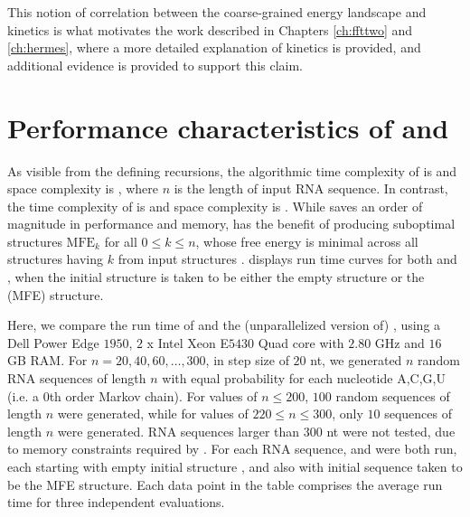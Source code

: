This notion of correlation between the coarse-grained energy landscape and
kinetics is what motivates the work described in Chapters \ref{ch:ffttwo}
and \ref{ch:hermes}, where a more detailed explanation of kinetics is provided,
and additional evidence is provided to support this claim.

\section{Performance characteristics of \fftbor and \rnabor}
\label{sec:fftbor:speed}

As visible from the defining recursions, the algorithmic time complexity of
\rnabor is  and space complexity is , where $n$ is
the length of input RNA sequence. In contrast, the time complexity of
\fftbor is  and space complexity is .
While \fftbor saves an order of magnitude in performance and memory,
\rnabor has the benefit of producing suboptimal structures $\text{MFE}_k$
for all $0 \leq k \leq n$, whose free energy is minimal across all structures
having \bpd $k$ from input structures \strSt.
 displays run time curves for both
\rnabor and \fftbor, when the initial structure \strSt is
taken to be either the empty structure or the \mfe
(MFE) structure.

Here, we compare the run time of \rnabor \citep{freyhult.b07} and
the (unparallelized version of) \fftbor, using
a Dell Power Edge $1950$, $2$ x Intel Xeon E$5430$ Quad
core with $2.80$ GHz and $16$ GB RAM. For $n = 20,40,60,\dots,300$, in step
size of $20$ nt, we generated $n$ random RNA sequences of length $n$ with equal
probability for each nucleotide A,C,G,U (i.e. a 0th order Markov chain).
For values of $n \leq 200$, $100$ random sequences of length
$n$ were generated, while for values of $220 \leq n \leq 300$, only
$10$ sequences of length $n$ were generated.
RNA sequences larger than $300$ nt were not tested,
due to  memory constraints required by \rnabor.
For each RNA sequence, \rnabor and \fftbor were both run,
each starting with empty initial structure \strSt, and also
with initial sequence \strSt taken to be the MFE structure.
Each data point in the table comprises the average run time for three
independent evaluations.

